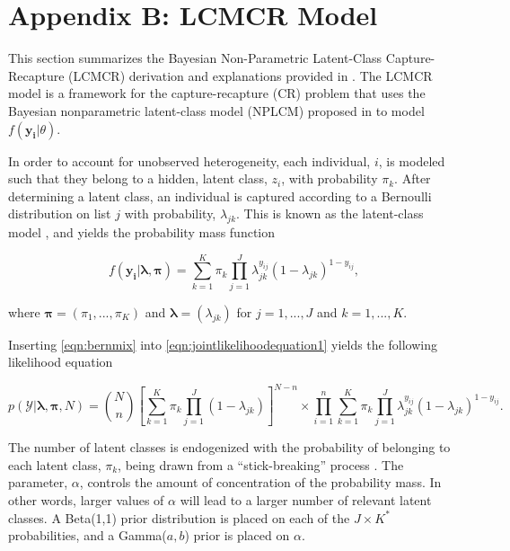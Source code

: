 \documentclass[
  12pt,
]{article}
\begin{document}
\newpage

\section{Appendix B: LCMCR Model}
\label{LCMCRmodel}

This section summarizes the Bayesian Non-Parametric Latent-Class
Capture-Recapture (LCMCR) derivation and explanations provided in
\cite{manriquevallier_bayesian_2016}. The LCMCR model is a framework for
the capture-recapture (CR) problem that uses the Bayesian nonparametric
latent-class model (NPLCM) proposed in \cite{dunson_nonparametric_2009}
to model \(f(\boldsymbol{y_i}|\theta)\).

In order to account for unobserved heterogeneity, each individual,
\(i\), is modeled such that they belong to a hidden, latent class,
\(z_i\), with probability \(\pi_k\). After determining a latent class,
an individual is captured according to a Bernoulli distribution on list
\(j\) with probability, \(\lambda_{jk}\). This is known as the
latent-class model \citep{goodman_exploratory_1974}, and yields the
probability mass function

\begin{equation}
\label{eqn:bernmix}
f(\boldsymbol{y_i}|\boldsymbol{\lambda,\pi}) = \sum_{k=1}^K \pi_k \prod_{j=1}^J \lambda_{jk}^{y_{ij}}(1-\lambda_{jk})^{1-y_{ij}},
\end{equation}

where \(\boldsymbol{\pi}=(\pi_1,...,\pi_K)\) and
\(\boldsymbol{\lambda} = (\lambda_{jk})\) for \(j=1,...,J\) and
\(k=1,...,K\).

Inserting \autoref{eqn:bernmix} into
\autoref{eqn:jointlikelihoodequation1} yields the following likelihood
equation

\begin{equation}
\label{eqn:LCMCRlikelihood}
p(\mathcal{Y}|\boldsymbol{\lambda},\boldsymbol{\pi},N)=\binom{N}{n} \left[ \sum_{k=1}^K \pi_k \prod_{j=1}^J (1-\lambda_{jk}) \right]^{N-n} \times \prod_{i=1}^n \sum_{k=1}^K \pi_k \prod_{j=1}^J \lambda_{jk}^{y_{ij}}(1-\lambda_{jk})^{1-y_{ij}}.
\end{equation}

The number of latent classes is endogenized with the probability of
belonging to each latent class, \(\pi_k\), being drawn from a
``stick-breaking'' process \citep{sethuraman_constructive_1991}. The
parameter, \(\alpha\), controls the amount of concentration of the
probability mass. In other words, larger values of \(\alpha\) will lead
to a larger number of relevant latent classes. A Beta(1,1) prior
distribution is placed on each of the \(J \times K^*\) probabilities,
and a Gamma(\(a,b\)) prior is placed on \(\alpha\).
\end{document}
